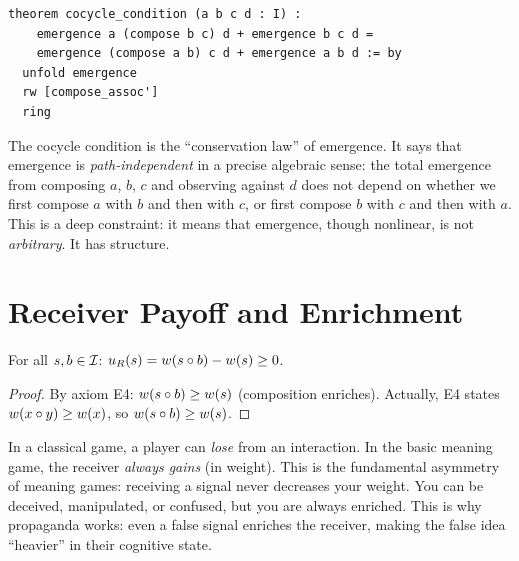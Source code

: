 \begin{lstlisting}[caption={Lean 4: The cocycle condition}]
theorem cocycle_condition (a b c d : I) :
    emergence a (compose b c) d + emergence b c d =
    emergence (compose a b) c d + emergence a b d := by
  unfold emergence
  rw [compose_assoc']
  ring
\end{lstlisting}

\begin{interpretation}
The cocycle condition is the ``conservation law'' of emergence. It says that
emergence is \emph{path-independent} in a precise algebraic sense: the total
emergence from composing $a$, $b$, $c$ and observing against $d$ does not
depend on whether we first compose $a$ with $b$ and then with $c$, or first
compose $b$ with $c$ and then with $a$. This is a deep constraint: it means
that emergence, though nonlinear, is not \emph{arbitrary}. It has structure.
\end{interpretation}


\section{Receiver Payoff and Enrichment}

\begin{theorem}
\label{thm:receiver-enriched}
For all $s, b \in \mathcal{I}$: $u_R(s) = w(s \circ b) - w(s) \geq 0$.
\end{theorem}

\begin{proof}
By axiom E4: $w(s \circ b) \geq w(s)$ (composition enriches).
Actually, E4 states $w(x \circ y) \geq w(x)$, so
$w(s \circ b) \geq w(s)$.
\end{proof}

\begin{remark}
In a classical game, a player can \emph{lose} from an interaction. In the
basic meaning game, the receiver \emph{always gains} (in weight). This is
the fundamental asymmetry of meaning games: receiving a signal never
decreases your weight. You can be deceived, manipulated, or confused, but
you are always enriched. This is why propaganda works: even a false signal
enriches the receiver, making the false idea ``heavier'' in their cognitive
state.
\end{remark}

